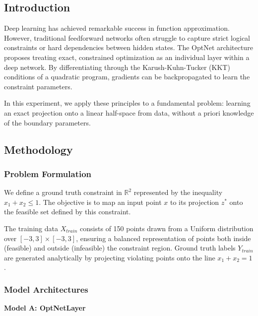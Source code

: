 \documentclass{article}
\begin{document}
\begin{appendices}
  \subsection{Introduction}
  Deep learning has achieved remarkable success in function approximation. However, traditional feedforward networks often struggle to capture strict logical constraints or hard dependencies between hidden states. The OptNet architecture proposes treating exact, constrained optimization as an individual layer within a deep network. By differentiating through the Karush-Kuhn-Tucker (KKT) conditions of a quadratic program, gradients can be backpropagated to learn the constraint parameters.

  In this experiment, we apply these principles to a fundamental problem: learning an exact projection onto a linear half-space from data, without a priori knowledge of the boundary parameters.

  \subsection{Methodology}

  \subsubsection{Problem Formulation}
  We define a ground truth constraint in $\mathbb{R}^2$ represented by the inequality $x_1 + x_2 \le 1$. The objective is to map an input point $x$ to its projection $z^*$ onto the feasible set defined by this constraint.

  The training data $X_{train}$ consists of 150 points drawn from a Uniform distribution over $[-3, 3] \times [-3, 3]$, ensuring a balanced representation of points both inside (feasible) and outside (infeasible) the constraint region. Ground truth labels $Y_{train}$ are generated analytically by projecting violating points onto the line $x_1 + x_2 = 1$.

  \subsubsection{Model Architectures}

  \textbf{Model A: OptNetLayer}


\end{appendices}
\end{document}
